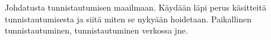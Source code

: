 Johdatusta tunnistautumisen maailmaan. Käydään läpi perus käsitteitä tunnistautumisesta ja siitä miten se nykyään hoidetaan. Paikallinen tunnistautuminen, tunnistautuminen verkossa jne.

